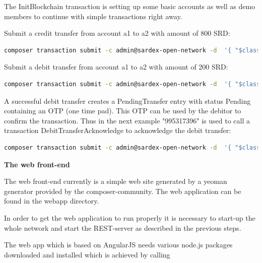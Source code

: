 The InitBlockchain transaction is setting up some basic accounts as well as demo members to continue with simple transactions right away.

Submit a credit transfer from account a1 to a2 with amount of 800 SRD:

\begin{lstlisting}[language=bash]
	composer transaction submit -c admin@sardex-open-network -d  '{ "$class": "net.sardex.interlace.CreditTransfer", "amount": 800, "senderAccount": "resource:net.sardex.interlace.CCAccount#a1", "recipientAccount": "resource:net.sardex.interlace.CCAccount#a2" }'
\end{lstlisting}

Submit a debit transfer from account a1 to a2 with amount of 200 SRD:

\begin{lstlisting}[language=bash]
	composer transaction submit -c admin@sardex-open-network -d  '{ "$class": "net.sardex.interlace.DebitTransfer", "amount": 200, "senderAccount": "resource:net.sardex.interlace.CCAccount#a1", "recipientAccount": "resource:net.sardex.interlace.CCAccount#a2" }'
\end{lstlisting}

A successful debit transfer creates a PendingTransfer entry with status Pending containing an OTP (one time pad). This OTP can be used by the debitor to confirm the transaction. Thus in the next example "995317396" is used to call a transaction DebitTransferAcknowledge to acknowledge the debit transfer:

\begin{lstlisting}[language=bash]
	composer transaction submit -c admin@sardex-open-network -d  '{ "$class": "net.sardex.interlace.DebitTransferAcknowledge", "transfer": "resource:net.sardex.interlace.PendingTransfer#995317396" }'
\end{lstlisting}

\textbf{The web front-end}

The web front-end currently is a simple web site generated by a yeoman generator provided by the composer-community. The web application can be found in the webapp directory.

In order to get the web application to run properly it is necessary to start-up the whole network and start the REST-server as described in the previous steps.

The web app which is based on AngularJS needs various node.js packages downloaded and installed which is achieved by calling


